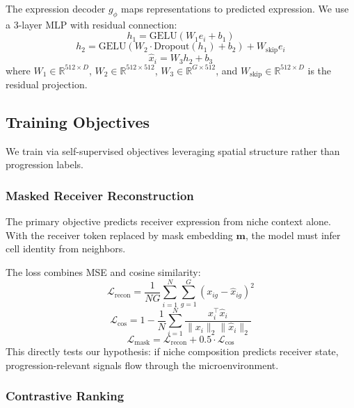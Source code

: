 The expression decoder $g_\phi$ maps representations to predicted expression. We use a 3-layer MLP with residual connection:
\begin{equation}
    h_1 = \text{GELU}(W_1 e_i + b_1)
\end{equation}
\begin{equation}
    h_2 = \text{GELU}(W_2 \cdot \text{Dropout}(h_1) + b_2) + W_{\text{skip}} e_i
\end{equation}
\begin{equation}
    \hat{x}_i = W_3 h_2 + b_3
\end{equation}
where $W_1 \in \mathbb{R}^{512 \times D}$, $W_2 \in \mathbb{R}^{512 \times 512}$, $W_3 \in \mathbb{R}^{G \times 512}$, and $W_{\text{skip}} \in \mathbb{R}^{512 \times D}$ is the residual projection.

\subsection{Training Objectives}

We train via self-supervised objectives leveraging spatial structure rather than progression labels.

\subsubsection{Masked Receiver Reconstruction}

The primary objective predicts receiver expression from niche context alone. With the receiver token replaced by mask embedding $\mathbf{m}$, the model must infer cell identity from neighbors.

The loss combines MSE and cosine similarity:
\begin{equation}
    \mathcal{L}_{\text{recon}} = \frac{1}{NG} \sum_{i=1}^{N} \sum_{g=1}^{G} (x_{ig} - \hat{x}_{ig})^2
\end{equation}
\begin{equation}
    \mathcal{L}_{\text{cos}} = 1 - \frac{1}{N} \sum_{i=1}^{N} \frac{x_i^\top \hat{x}_i}{\|x_i\|_2 \|\hat{x}_i\|_2}
\end{equation}
\begin{equation}
    \mathcal{L}_{\text{mask}} = \mathcal{L}_{\text{recon}} + 0.5 \cdot \mathcal{L}_{\text{cos}}
\end{equation}
This directly tests our hypothesis: if niche composition predicts receiver state, progression-relevant signals flow through the microenvironment.

\subsubsection{Contrastive Ranking}

